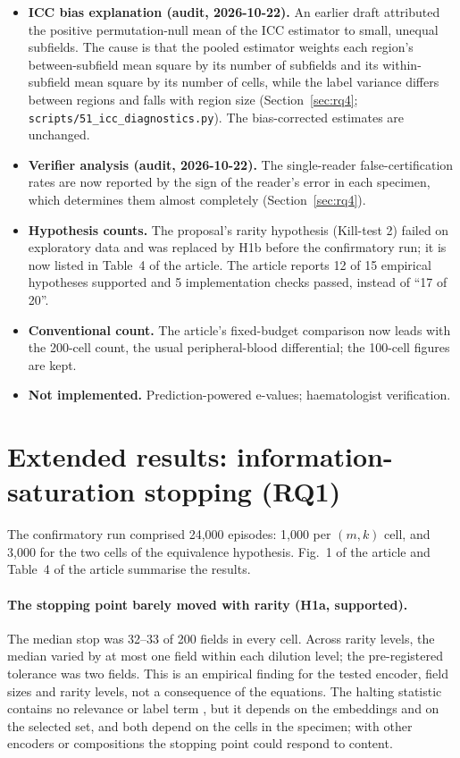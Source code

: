 \documentclass[11pt]{article}
\theoremstyle{remark}
\theoremstyle{definition}
\begin{document}
\begin{itemize}
\item \textbf{ICC bias explanation (audit, 2026-10-22).} An earlier draft attributed the positive permutation-null mean of the ICC estimator to small, unequal subfields. The cause is that the pooled estimator weights each region's between-subfield mean square by its number of subfields and its within-subfield mean square by its number of cells, while the label variance differs between regions and falls with region size (Section~\ref{sec:rq4}; \texttt{scripts/51\_icc\_diagnostics.py}). The bias-corrected estimates are unchanged.
\item \textbf{Verifier analysis (audit, 2026-10-22).} The single-reader false-certification rates are now reported by the sign of the reader's error in each specimen, which determines them almost completely (Section~\ref{sec:rq4}).
\item \textbf{Hypothesis counts.} The proposal's rarity hypothesis (Kill-test 2) failed on exploratory data and was replaced by H1b before the confirmatory run; it is now listed in Table~4 of the article. The article reports 12 of 15 empirical hypotheses supported and 5 implementation checks passed, instead of ``17 of 20''.
\item \textbf{Conventional count.} The article's fixed-budget comparison now leads with the 200-cell count, the usual peripheral-blood differential; the 100-cell figures are kept.
\item \textbf{Not implemented.} Prediction-powered e-values; haematologist verification.
\end{itemize}

\section{Extended results: information-saturation stopping (RQ1)}\label{sec:partI}
The confirmatory run comprised 24,000 episodes: 1,000 per $(m,k)$ cell, and 3,000 for the two cells of the equivalence hypothesis. Fig.~1 of the article and Table~4 of the article summarise the results.

\paragraph{The stopping point barely moved with rarity (H1a, supported).} The median stop was 32--33 of 200 fields in every cell. Across rarity levels, the median varied by at most one field within each dilution level; the pre-registered tolerance was two fields. This is an empirical finding for the tested encoder, field sizes and rarity levels, not a consequence of the equations. The halting statistic contains no relevance or label term \cite{mittal2026infodpp}, but it depends on the embeddings and on the selected set, and both depend on the cells in the specimen; with other encoders or compositions the stopping point could respond to content.
\end{document}

